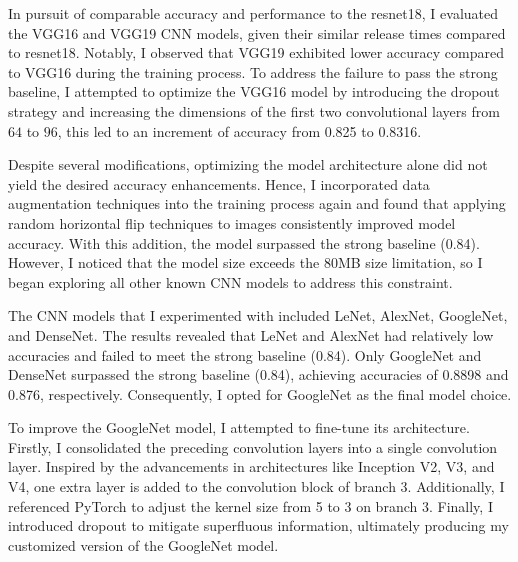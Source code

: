 \documentclass[a4paper, 12pt]{article}
\begin{document}
In pursuit of comparable accuracy and performance to the resnet18, I evaluated the VGG16\cite{simonyan2015deep} and VGG19\cite{simonyan2015deep} CNN models, given their similar release times compared to resnet18. Notably, I observed that VGG19 exhibited lower accuracy compared to VGG16 during the training process. To address the failure to pass the strong baseline,  I attempted to optimize the VGG16 model by introducing the dropout strategy and increasing the dimensions of the first two convolutional layers from $64$ to $96$, this led to an increment of accuracy from 0.825 to 0.8316. 

Despite several modifications, optimizing the model architecture alone did not yield the desired accuracy enhancements. Hence, I incorporated data augmentation techniques into the training process again and found that applying random horizontal flip techniques to images consistently improved model accuracy. With this addition, the model surpassed the strong baseline (0.84). However, I noticed that the model size exceeds the 80MB size limitation, so I began exploring all other known CNN models to address this constraint.

\vspace{2em}

The CNN models that I experimented with included LeNet\cite{726791}, AlexNet\cite{NIPS2012_c399862d}, GoogleNet\cite{szegedy2014going}, and DenseNet\cite{huang2018densely}. The results revealed that LeNet and AlexNet had relatively low accuracies and failed to meet the strong baseline (0.84). Only GoogleNet and DenseNet surpassed the strong baseline (0.84), achieving accuracies of 0.8898 and 0.876, respectively. Consequently, I opted for GoogleNet as the final model choice.

To improve the GoogleNet model, I attempted to fine-tune its architecture. Firstly, I consolidated the preceding convolution layers into a single convolution layer.  Inspired by the advancements in architectures like Inception V2, V3, and V4, one extra layer is added to the convolution block of branch 3. Additionally, I referenced PyTorch to adjust the kernel size from 5 to 3 on branch 3. Finally, I introduced dropout to mitigate superfluous information, ultimately producing my customized version of the GoogleNet model.



\end{document}
